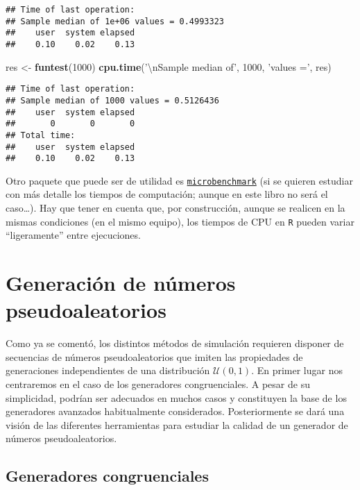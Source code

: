 \documentclass[
]{book}
\newenvironment{Shaded}{\begin{snugshade}}{\end{snugshade}}
\newcommand{\CharTok}[1]{\textcolor[rgb]{0.31,0.60,0.02}{#1}}
\newcommand{\DecValTok}[1]{\textcolor[rgb]{0.00,0.00,0.81}{#1}}
\newcommand{\KeywordTok}[1]{\textcolor[rgb]{0.13,0.29,0.53}{\textbf{#1}}}
\newcommand{\NormalTok}[1]{#1}
\newcommand{\StringTok}[1]{\textcolor[rgb]{0.31,0.60,0.02}{#1}}
\theoremstyle{break}
\theoremstyle{definition}
\theoremstyle{definition}
\theoremstyle{definition}
\theoremstyle{remark}
\begin{document}
\begin{verbatim}
## Time of last operation: 
## Sample median of 1e+06 values = 0.4993323 
##    user  system elapsed 
##    0.10    0.02    0.13
\end{verbatim}

\begin{Shaded}
\begin{Highlighting}[]
\NormalTok{res <-}\StringTok{ }\KeywordTok{funtest}\NormalTok{(}\DecValTok{1000}\NormalTok{)}
\KeywordTok{cpu.time}\NormalTok{(}\StringTok{'}\CharTok{\textbackslash{}n}\StringTok{Sample median of'}\NormalTok{, }\DecValTok{1000}\NormalTok{, }\StringTok{'values ='}\NormalTok{, res)}
\end{Highlighting}
\end{Shaded}

\begin{verbatim}
## Time of last operation: 
## Sample median of 1000 values = 0.5126436 
##    user  system elapsed 
##       0       0       0 
## Total time:
##    user  system elapsed 
##    0.10    0.02    0.13
\end{verbatim}

Otro paquete que puede ser de utilidad es
\href{https://CRAN.R-project.org/package=microbenchmark}{\texttt{microbenchmark}}
(si se quieren estudiar con más detalle los tiempos de computación;
aunque en este libro no será el caso\ldots).
Hay que tener en cuenta que, por construcción, aunque se realicen en la mismas
condiciones (en el mismo equipo), los tiempos de CPU en \texttt{R} pueden variar
``ligeramente'' entre ejecuciones.

\hypertarget{cap3}{%
\chapter{Generación de números pseudoaleatorios}\label{cap3}}

Como ya se comentó, los distintos métodos de simulación requieren disponer de secuencias de números pseudoaleatorios que imiten las propiedades de generaciones independientes de una distribución \(\mathcal{U}(0,1)\).
En primer lugar nos centraremos en el caso de los generadores congruenciales. A pesar de su simplicidad, podrían ser adecuados en muchos casos y constituyen la base de los generadores avanzados habitualmente considerados.
Posteriormente se dará una visión de las diferentes herramientas para estudiar la calidad de un generador de números pseudoaleatorios.

\hypertarget{gen-cong}{%
\section{Generadores congruenciales}\label{gen-cong}}
\end{document}
